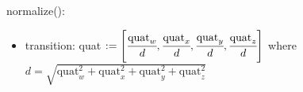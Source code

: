 \documentclass[12pt, titlepage]{article}
\begin{document}
\noindent normalize():
\begin{itemize}
\item transition: quat $:= \left[ \cfrac{\text{quat}_w}{d}, \cfrac{\text{quat}_x}{d},
\cfrac{\text{quat}_y}{d}, \cfrac{\text{quat}_z}{d} \right]$ where $d = \sqrt{\text{quat}_w^2 +
\text{quat}_x^2 + \text{quat}_y^2 + \text{quat}_z^2}$
\end{itemize}



\end{document}
